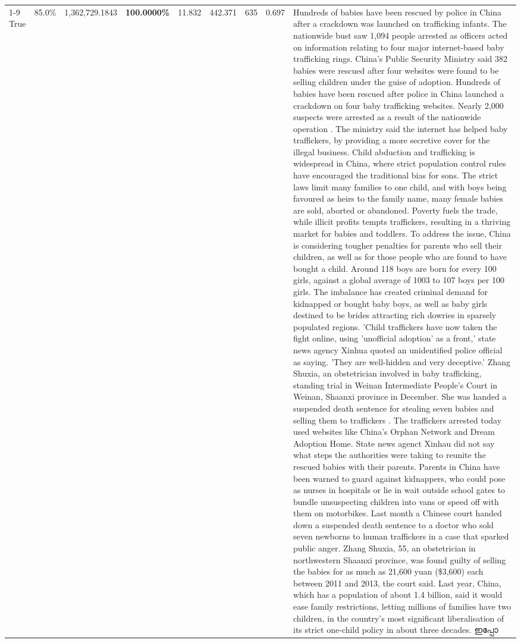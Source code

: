 \begin{table}[H]
\begin{tabular}{lllrlllll}
\cline{1-9}
True & 85.0\% & 1,362,729.1843 & \bfseries \color{red} 100.0000\% & 11.832 & 442.371 & 635 & 0.697 & Hundreds of babies have been rescued by police in China after a crackdown was launched on trafficking infants. The nationwide bust saw 1,094 people arrested as officers acted on information relating to four major internet-based baby trafficking rings. China's Public Security Ministry said 382 babies were rescued after four websites were found to be selling children under the guise of adoption. Hundreds of babies have been rescued after police in China launched a crackdown on four baby trafficking websites. Nearly 2,000 suspects were arrested as a result of the nationwide operation . The ministry said the internet has helped baby traffickers, by providing a more secretive cover for the illegal business. Child abduction and trafficking is widespread in China, where strict population control rules have encouraged the traditional bias for sons. The strict laws limit many families to one child, and with boys being favoured as heirs to the family name, many female babies are sold, aborted or abandoned. Poverty fuels the trade, while illicit profits tempts traffickers, resulting in a thriving market for babies and toddlers. To address the issue, China is considering tougher penalties for parents who sell their children, as well as for those people who are found to have bought a child. Around 118 boys are born for every 100 girls, against a global average of 1003 to 107 boys per 100 girls. The imbalance has created criminal demand for kidnapped or bought baby boys, as well as baby girls destined to be brides attracting rich dowries in sparsely populated regions. 'Child traffickers have now taken the fight online, using 'unofficial adoption' as a front,' state news agency Xinhua quoted an unidentified police official as saying. 'They are well-hidden and very deceptive.' Zhang Shuxia, an obstetrician involved in baby trafficking, standing trial in Weinan Intermediate People's Court in Weinan, Shaanxi province in December. She was handed a suspended death sentence for stealing seven babies and selling them to traffickers . The traffickers arrested today used websites like China's Orphan Network and Dream Adoption Home. State news agenct Xinhau did not say what steps the authorities were taking to reunite the rescued babies with their parents. Parents in China have been warned to guard against kidnappers, who could pose as nurses in hospitals or lie in wait outside school gates to bundle unsuspecting children into vans or speed off with them on motorbikes. Last month a Chinese court handed down a suspended death sentence to a doctor who sold seven newborns to human traffickers in a case that sparked public anger. Zhang Shuxia, 55, an obstetrician in northwestern Shaanxi province, was found guilty of selling the babies for as much as 21,600 yuan (\$3,600) each between 2011 and 2013, the court said. Last year, China, which has a population of about 1.4 billion, said it would ease family restrictions, letting millions of families have two children, in the country's most significant liberalisation of its strict one-child policy in about three decades. ഇപ്പോ \\

\end{tabular}
\end{table}
